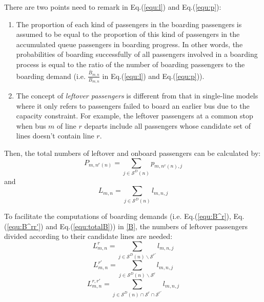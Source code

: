 \documentclass[smallextended]{svjour3}       %
\begin{document}
\begin{Abstract}
There are two points need to remark in \textup{Eq.(\ref{equ:l}) and Eq.(\ref{equ:p})}:
\begin{enumerate}[1)]
    \item The proportion of each kind of passengers in the boarding passengers is assumed to be equal to the proportion of this kind of passengers in the accumulated queue passengers in boarding progress. 
    In other words, the probabilities of boarding successfully of all passengers involved in a boarding process 
    is equal to the ratio of the number of boarding passengers to the boarding demand (i.e. $\frac{\overline{B}_{m,n}}{B_{m,n}}$ in Eq.(\ref{equ:l}) and Eq.(\ref{equ:p})).
    \item  The concept of \textit{leftover passengers} is different 
    from that in single-line models where it only refers to passengers failed to board an earlier bus due to the capacity constraint.
    For example, the leftover passengers at a common stop when bus $m$ of line $r$ departs include all passengers 
    whose candidate set of lines doesn't contain line $r$.
\end{enumerate}

Then, the total numbers of leftover and onboard passengers can be calculated by:
\begin{equation}
    \label{equ:P}
    P_{m,n^{r}(n)} = \sum_{j\in \mathcal{S}^{D}(n)} p_{m,n^{r}(n),j}
\end{equation}
and
\begin{equation}
    L_{m,n} = \sum_{j\in\mathcal{S}^{D}(n)} l_{m,n,j}
\end{equation}

To facilitate the computations of boarding demands 
(i.e. \textup{Eq.(\ref{equ:B^r}), Eq.(\ref{equ:B^rr'}) and Eq.(\ref{equ:totalB})}) in \ref{B}, 
the numbers of leftover passengers divided according to their candidate lines are needed:
\begin{equation}
    \label{equ:Lr}
    L_{m,n}^{r} = \sum_{j\in\mathcal{S}^{D}(n)\backslash\mathcal{S}^{r'}} l_{m,n,j}
\end{equation}
\begin{equation}
    L_{m,n}^{r'} = \sum_{j\in\mathcal{S}^{D}(n)\backslash\mathcal{S}^{r}} l_{m,n,j}
\end{equation}
\begin{equation}
    L_{m,n}^{r,r'} = \sum_{j\in\mathcal{S}^{D}(n)\cap \mathcal{S}^{r}\cap \mathcal{S}^{r'}} l_{m,n,j}
\end{equation}


\end{Abstract}
\end{document}
